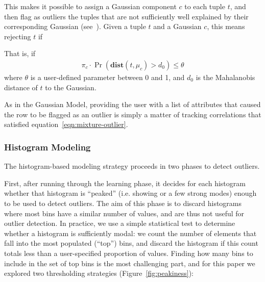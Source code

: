 This makes it possible to assign a Gaussian component $c$ to each tuple $t$, and then flag as outliers the tuples that are not sufficiently well explained by their corresponding Gaussian (see~\cite{Roberts1999}). Given a tuple $t$ and a Gaussian $c$, this means rejecting $t$ if 

That is, if 
\begin{align}
  \pi_c \cdot \Pr(\textbf{dist}(t, \mu_c) > d_0)  \leq \theta
  \label{eqn:mixture-outlier}
\end{align}
where $\theta$ is a user-defined parameter between 0 and 1, and $d_0$ is the Mahalanobis distance of $t$ to the Gaussian.
 
As in the Gaussian Model, providing the user with a list of attributes that caused the row to be flagged as an outlier is simply a matter of tracking correlations that satisfied equation~\eqref{eqn:mixture-outlier}.

\subsubsection{Histogram Modeling}
The histogram-based modeling strategy proceeds in two phases to detect outliers.

First, after running through the learning phase, it decides for each histogram whether that histogram is ``peaked'' (i.e. showing or a few strong modes) enough to be used to detect outliers. The aim of this phase is to discard histograms where most bins have a similar number of values, and are thus not useful for outlier detection. In practice, we use a simple statistical test to determine whether a histogram is sufficiently modal: we count the number of elements that fall into the most populated (``top'') bins, and discard the histogram if this count totals less than a user-specified proportion of values. Finding how many bins to include in the set of top bins is the most challenging part, and for this paper we explored two thresholding strategies (Figure~\ref{fig:peakiness}):

\begin{figure*}
  \centering
  \caption{Sample histograms, and corresponding decisions with distribution-dependent (\(D\)-independent) and distribution-independent (\(D\)-independent) thresholds. Each figure shows a sorted histogram, with the top bins hatched (in dotted green in the distribution-independent case, and in solid orange in the distribution-dependent case). The vertical arrows show the small value \(r=3\) in the distribution-dependent case. The weaknesses of the distribution-independent-model show in the third and fourth plots: in the third one the distribution-dependent strategy correctly rejects because of the small \(r\); in the fourth the distribution-independent strategy yields an incorrect threshold.}
  \label{fig:peakiness}
\end{figure*}

